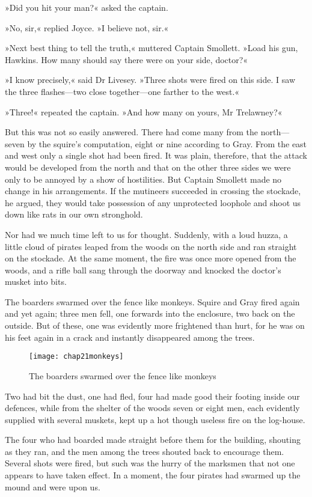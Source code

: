 »Did you hit your man?« asked the captain.

»No, sir,« replied Joyce. »I believe not, sir.«

»Next best thing to tell the truth,« muttered Captain Smollett. »Load his gun, Hawkins. How many should say there were on your side, doctor?«

»I know precisely,« said Dr Livesey. »Three shots were fired on this side. I saw the three flashes—two close together—one farther to the west.«

»Three!« repeated the captain. »And how many on yours, Mr Trelawney?«

But this was not so easily answered. There had come many from the north—seven by the squire's computation, eight or nine according to Gray. From the east and west only a single shot had been fired. It was plain, therefore, that the attack would be developed from the north and that on the other three sides we were only to be annoyed by a show of hostilities. But Captain Smollett made no change in his arrangements. If the mutineers succeeded in crossing the stockade, he argued, they would take possession of any unprotected loophole and shoot us down like rats in our own stronghold.

Nor had we much time left to us for thought. Suddenly, with a loud huzza, a little cloud of pirates leaped from the woods on the north side and ran straight on the stockade. At the same moment, the fire was once more opened from the woods, and a rifle ball sang through the doorway and knocked the doctor's musket into bits.

The boarders swarmed over the fence like monkeys. Squire and Gray fired again and yet again; three men fell, one forwards into the enclosure, two back on the outside. But of these, one was evidently more frightened than hurt, for he was on his feet again in a crack and instantly disappeared among the trees.

  \begin{sidewaysfigure}
\texttt{[image: chap21monkeys]}%
\caption{The boarders swarmed over the fence like monkeys}
\end{sidewaysfigure} 

Two had bit the dust, one had fled, four had made good their footing inside our defences, while from the shelter of the woods seven or eight men, each evidently supplied with several muskets, kept up a hot though useless fire on the log-house.

The four who had boarded made straight before them for the building, shouting as they ran, and the men among the trees shouted back to encourage them. Several shots were fired, but such was the hurry of the marksmen that not one appears to have taken effect. In a moment, the four pirates had swarmed up the mound and were upon us.

